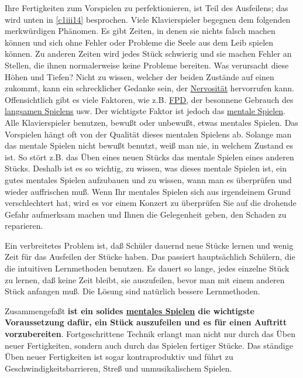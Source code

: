 Ihre Fertigkeiten zum Vorspielen zu perfektionieren, ist Teil des Ausfeilens; das wird unten in \hyperref[c1iii14]{\autoref{c1iii14}} besprochen.
Viele Klavierspieler begegnen dem folgenden merkwürdigen Phänomen.
Es gibt Zeiten, in denen sie nichts falsch machen können und sich ohne Fehler oder Probleme die Seele aus dem Leib spielen können.
Zu anderen Zeiten wird jedes Stück schwierig und sie machen Fehler an Stellen, die ihnen normalerweise keine Probleme bereiten.
Was verursacht diese Höhen und Tiefen?
Nicht zu wissen, welcher der beiden Zustände auf einen zukommt, kann ein schrecklicher Gedanke sein, der \hyperref[c1iii15]{Nervosität} hervorrufen kann.
Offensichtlich gibt es viele Faktoren, wie z.B. \hyperref[fpd]{FPD}, der besonnene Gebrauch des \hyperref[c1ii17]{langsamen Spielens} usw.
Der wichtigste Faktor ist jedoch das \hyperref[c1ii12]{mentale Spielen}.
Alle Klavierspieler benutzen, bewußt oder unbewußt, etwas mentales Spielen.
Das Vorspielen hängt oft von der Qualität dieses mentalen Spielens ab.
Solange man das mentale Spielen nicht bewußt benutzt, weiß man nie, in welchem Zustand es ist.
So stört z.B. das Üben eines neuen Stücks das mentale Spielen eines anderen Stücks.
Deshalb ist es so wichtig, zu wissen, was dieses mentale Spielen ist, ein gutes mentales Spielen aufzubauen und zu wissen, wann man es überprüfen und wieder auffrischen muß.
Wenn Ihr mentales Spielen sich aus irgendeinem Grund verschlechtert hat, wird es vor einem Konzert zu überprüfen Sie auf die drohende Gefahr aufmerksam machen und Ihnen die Gelegenheit geben, den Schaden zu reparieren.

Ein verbreitetes Problem ist, daß Schüler dauernd neue Stücke lernen und wenig Zeit für das Ausfeilen der Stücke haben.
Das passiert hauptsächlich Schülern, die die intuitiven Lernmethoden benutzen.
Es dauert so lange, jedes einzelne Stück zu lernen, daß keine Zeit bleibt, sie auszufeilen, bevor man mit einem anderen Stück anfangen muß.
Die Lösung sind natürlich bessere Lernmethoden.
 
Zusammengefaßt \textbf{ist ein solides \hyperref[c1ii12]{mentales Spielen} die wichtigste Voraussetzung dafür, ein Stück auszufeilen und es für einen Auftritt vorzubereiten}.
Fortgeschrittene Technik erlangt man nicht nur durch das Üben neuer Fertigkeiten, sondern auch durch das Spielen fertiger Stücke.
Das ständige Üben neuer Fertigkeiten ist sogar kontraproduktiv und führt zu Geschwindigkeitsbarrieren, Streß und unmusikalischem Spielen.
 



